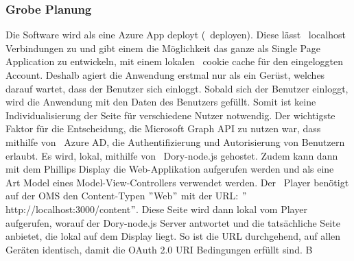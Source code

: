 \subsubsection{Grobe Planung}
Die Software wird als eine Azure App deployt (~\gls{deployen}).
Diese lässt ~\gls{localhost} Verbindungen zu und gibt einem die Möglichkeit das ganze als Single Page Application zu entwickeln, mit einem lokalen ~\gls{cookie cache} für den eingeloggten Account.
Deshalb agiert die Anwendung erstmal nur als ein Gerüst, welches darauf wartet, dass der Benutzer sich einloggt.
Sobald sich der Benutzer einloggt, wird die Anwendung mit den Daten des Benutzers gefüllt.
Somit ist keine Individualisierung der Seite für verschiedene Nutzer notwendig.
\newline
{}
Der wichtigste Faktor für die Entscheidung, die Microsoft Graph API zu nutzen war, dass mithilfe von ~\gls{Azure AD}, die Authentifizierung und Autorisierung von Benutzern erlaubt.
Es wird, lokal, mithilfe von ~\gls{Dory-node.js} gehostet.
Zudem kann dann mit dem Phillips Display die Web-Applikation aufgerufen werden und als eine Art Model eines Model-View-Controllers verwendet werden.
\newline
Der ~\gls{Player} benötigt auf der OMS den Content-Typen \("\)Web\("\)
\newline
mit der URL: \("\)http://localhost:3000/content\("\).
Diese Seite wird dann lokal vom Player aufgerufen, worauf der Dory-node.js Server antwortet und die tatsächliche Seite anbietet, die lokal auf dem Display liegt.
So ist die URL durchgehend, auf allen Geräten identisch, damit die OAuth 2.0 URI Bedingungen erfüllt sind.
\newline
\newline
B
\newline
\pagebreak

